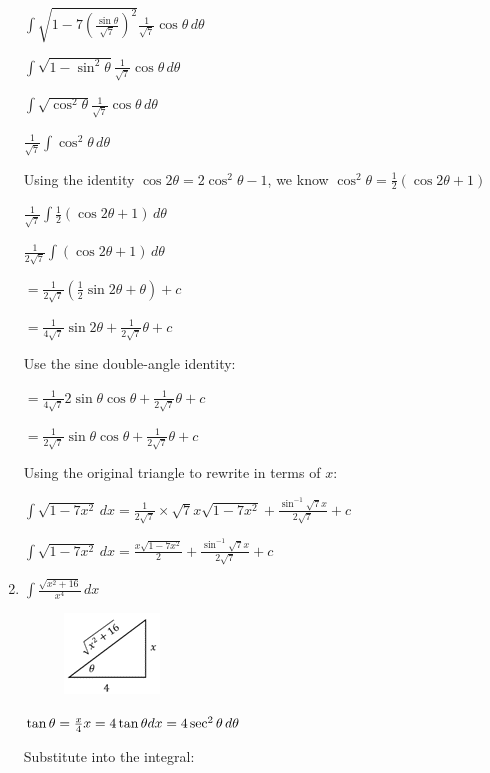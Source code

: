 \documentclass[../main.tex]{subfiles}
\begin{document}
\begin{enumerate}
    \(\int \sqrt{1-7(\frac{\sin{\theta}}{\sqrt{7}})^2}\frac{1}{\sqrt{7}}\cos{\theta}\,d\theta\)

    \(\int \sqrt{1-\sin^2{\theta}}\frac{1}{\sqrt{7}}\cos{\theta}\,d\theta\)

    \(\int \sqrt{\cos^2{\theta}}\frac{1}{\sqrt{7}}\cos{\theta}\,d\theta\)

    \(\frac{1}{\sqrt{7}}\int \cos^2{\theta}\,d\theta\)
    
    Using the identity \(\cos{2\theta}=2\cos^2{\theta}-1\), we know \(\cos^2{\theta}=\frac{1}{2}(\cos{2\theta}+1)\)

    \(\frac{1}{\sqrt{7}}\int \frac{1}{2}(\cos{2\theta}+1)\,d\theta\)

    \(\frac{1}{2\sqrt{7}}\int (\cos{2\theta}+1)\,d\theta\)
    
    \(=\frac{1}{2\sqrt{7}}(\frac{1}{2}\sin{2\theta}+\theta)+c\)

    \(=\frac{1}{4\sqrt{7}}\sin{2\theta}+\frac{1}{2\sqrt{7}}\theta+c\)

    Use the sine double-angle identity:

    \(=\frac{1}{4\sqrt{7}}2\sin{\theta}\cos{\theta}+\frac{1}{2\sqrt{7}}\theta+c\)

    \(=\frac{1}{2\sqrt{7}}\sin{\theta}\cos{\theta}+\frac{1}{2\sqrt{7}}\theta+c\)

    Using the original triangle to rewrite in terms of \(x\):

    \(\int \sqrt{1-7x^2}\,dx=\frac{1}{2\sqrt{7}}\times \sqrt{7}x\sqrt{1-7x^2}+\frac{\sin^{-1}{\sqrt{7}x}}{2\sqrt{7}}+c\)

    \(\int \sqrt{1-7x^2}\,dx=\frac{x\sqrt{1-7x^2}}{2}+\frac{\sin^{-1}{\sqrt{7}x}}{2\sqrt{7}}+c\)
    
    \item 
    \(\int \frac{\sqrt{x^2+16}}{x^4}\,dx\)
    \begin{figure}[h]
        \includegraphics{images/trigsuba4.png}
    \end{figure}

    \(\tan{\theta}=\frac{x}{4}\\
    x=4\tan{\theta}\\
    dx=4\sec^2{\theta}\,d\theta\)

    Substitute into the integral:


\end{enumerate}
\end{document}
